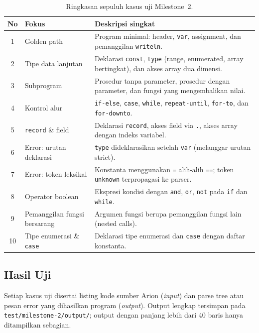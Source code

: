 \documentclass[11pt,a4paper]{article}
\begin{document}
\begin{table}[H]
\centering
\footnotesize
\begin{tabularx}{\textwidth}{c l X}
\toprule
\textbf{No} & \textbf{Fokus} & \textbf{Deskripsi singkat} \\
\midrule
1 & Golden path                & Program minimal: header, \texttt{var}, assignment, dan pemanggilan \texttt{writeln}. \\
2 & Tipe data lanjutan         & Deklarasi \texttt{const}, \texttt{type} (range, enumerated, array bertingkat), dan akses array dua dimensi. \\
3 & Subprogram                 & Prosedur tanpa parameter, prosedur dengan parameter, dan fungsi yang mengembalikan nilai. \\
4 & Kontrol alur               & \texttt{if-else}, \texttt{case}, \texttt{while}, \texttt{repeat-until}, \texttt{for-to}, dan \texttt{for-downto}. \\
5 & \texttt{record} \& field   & Deklarasi \texttt{record}, akses field via \texttt{.}, akses array dengan indeks variabel. \\
6 & Error: urutan deklarasi    & \texttt{type} dideklarasikan setelah \texttt{var} (melanggar urutan strict). \\
7 & Error: token leksikal      & Konstanta menggunakan \texttt{=} alih-alih \texttt{==}; token \texttt{unknown} terpropagasi ke parser. \\
8 & Operator boolean           & Ekspresi kondisi dengan \texttt{and}, \texttt{or}, \texttt{not} pada \texttt{if} dan \texttt{while}. \\
9 & Pemanggilan fungsi bersarang & Argumen fungsi berupa pemanggilan fungsi lain (nested calls). \\
10 & Tipe enumerasi \& \texttt{case} & Deklarasi tipe enumerasi dan \texttt{case} dengan daftar konstanta. \\
\bottomrule
\end{tabularx}
\caption{Ringkasan sepuluh kasus uji Milestone~2.}
\end{table}

\subsection{Hasil Uji}

Setiap kasus uji disertai listing kode sumber Arion (\textit{input}) dan
parse tree atau pesan error yang dihasilkan program (\textit{output}).
Output lengkap tersimpan pada \texttt{test/milestone-2/output/}; output
dengan panjang lebih dari 40 baris hanya ditampilkan sebagian.
\end{document}
